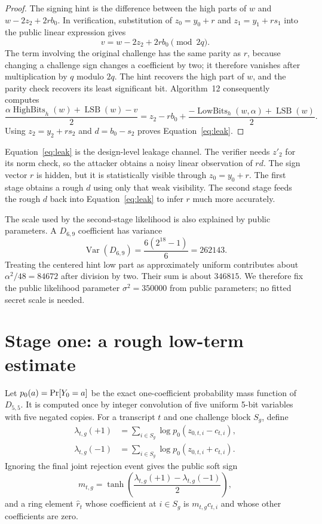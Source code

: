 \documentclass[11pt]{article}
\newcommand{\HB}{\operatorname{HighBits}}
\newcommand{\Prb}{\mathop{\rm Pr}}
\begin{document}
\begin{proof}
The signing hint is the difference between the high parts of $w$ and
$w-2z_2+2rb_0$.  In verification, substitution of
$z_0=y_0+r$ and $z_1=y_1+rs_1$ into the public linear expression gives
\[
 v=w-2z_2+2rb_0\pmod{2q}.
\]
The term involving the original challenge has the same parity as $r$, because changing a
challenge sign changes a coefficient by two; it therefore vanishes after multiplication by
$q$ modulo $2q$.  The hint recovers the high part of $w$, and the parity check recovers its
least significant bit.  Algorithm~12 consequently computes
\[
 \frac{\alpha\HB_h(w)+\operatorname{LSB}(w)-v}{2}
 =z_2-rb_0+
   \frac{-\operatorname{LowBits}_h(w,\alpha)+\operatorname{LSB}(w)}{2}.
\]
Using $z_2=y_2+rs_2$ and $d=b_0-s_2$ proves Equation~\eqref{eq:leak}.
\end{proof}

Equation~\eqref{eq:leak} is the design-level leakage channel.  The verifier needs $z'_2$ for
its norm check, so the attacker obtains a noisy linear observation of $rd$.  The sign vector
$r$ is hidden, but it is statistically visible through $z_0=y_0+r$.  The first stage obtains a
rough $d$ using only that weak visibility.  The second stage feeds the rough $d$ back into
Equation~\eqref{eq:leak} to infer $r$ much more accurately.

The scale used by the second-stage likelihood is also explained by public parameters.  A
$D_{6,9}$ coefficient has variance
\begin{equation}
 \operatorname{Var}(D_{6,9})
 =\frac{6(2^{18}-1)}{6}=262143.                         \label{eq:y2var}
\end{equation}
Treating the centered hint low part as approximately uniform contributes about
$\alpha^2/48=84672$ after division by two.  Their sum is about $346815$.  We therefore fix
the public likelihood parameter $\sigma^2=350000$ from public parameters; no fitted secret
scale is needed.

\section{Stage one: a rough low-term estimate}
\label{sec:baseline}

Let $p_0(a)=\Prb[Y_0=a]$ be the exact one-coefficient probability mass function of
$D_{5,5}$.  It is computed once by integer convolution of five uniform 5-bit variables with
five negated copies.  For a transcript $t$ and one challenge block $S_g$, define
\begin{align}
 \lambda_{t,g}(+1)&=\sum_{i\in S_g}\log p_0(z_{0,t,i}-c_{t,i}),\\
 \lambda_{t,g}(-1)&=\sum_{i\in S_g}\log p_0(z_{0,t,i}+c_{t,i}).    \label{eq:blockll}
\end{align}
Ignoring the final joint rejection event gives the public soft sign
\begin{equation}
 m_{t,g}=\tanh\!\left(\frac{\lambda_{t,g}(+1)-
                                  \lambda_{t,g}(-1)}{2}\right),    \label{eq:softsign}
\end{equation}
and a ring element $\widehat r_t$ whose coefficient at $i\in S_g$ is
$m_{t,g}c_{t,i}$ and whose other coefficients are zero.
\end{document}
